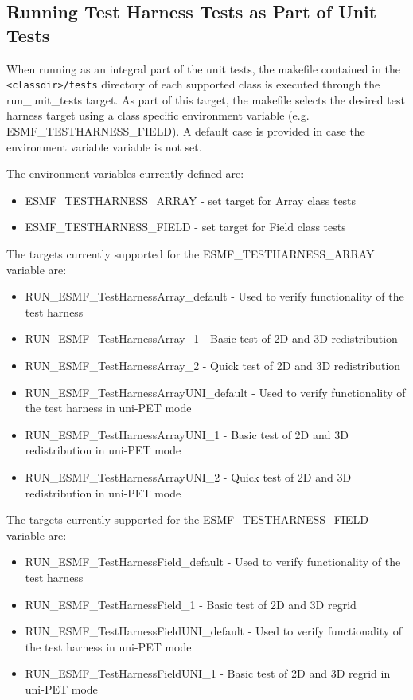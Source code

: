 \subsection{Running Test Harness Tests as Part of Unit Tests}
When running as an integral part of the unit tests, the makefile contained in the
\texttt{<classdir>/tests} directory of each supported class is executed through the run\_unit\_tests target.
As part of this target, the makefile selects the desired test harness target using a class
specific environment variable (e.g. ESMF\_TESTHARNESS\_FIELD).  A default case is provided in
case the environment variable variable is not set.

The environment variables currently defined are:
\begin{itemize}
\item ESMF\_TESTHARNESS\_ARRAY - set target for Array class tests
\item ESMF\_TESTHARNESS\_FIELD - set target for Field class tests
\end{itemize}

The targets currently supported for the ESMF\_TESTHARNESS\_ARRAY variable are:
\begin{itemize}
\item RUN\_ESMF\_TestHarnessArray\_default - Used to verify functionality of the test harness
\item RUN\_ESMF\_TestHarnessArray\_1 - Basic test of 2D and 3D redistribution
\item RUN\_ESMF\_TestHarnessArray\_2 - Quick test of 2D and 3D redistribution
\item RUN\_ESMF\_TestHarnessArrayUNI\_default - Used to verify functionality of the test harness in uni-PET mode
\item RUN\_ESMF\_TestHarnessArrayUNI\_1 - Basic test of 2D and 3D redistribution in uni-PET mode
\item RUN\_ESMF\_TestHarnessArrayUNI\_2 - Quick test of 2D and 3D redistribution in uni-PET mode
\end{itemize}

The targets currently supported for the ESMF\_TESTHARNESS\_FIELD variable are:
\begin{itemize}
\item RUN\_ESMF\_TestHarnessField\_default - Used to verify functionality of the test harness
\item RUN\_ESMF\_TestHarnessField\_1 - Basic test of 2D and 3D regrid
\item RUN\_ESMF\_TestHarnessFieldUNI\_default - Used to verify functionality of the test harness in uni-PET mode
\item RUN\_ESMF\_TestHarnessFieldUNI\_1 - Basic test of 2D and 3D regrid in uni-PET mode
\end{itemize}

